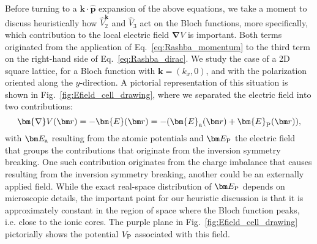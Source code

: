 Before turning to a $\bm{k} \cdot \hat{\bm{p}}$ expansion of the above equations, we take a moment to discuss heuristically how $\hat{V}^{\bm k}_2$ and $\hat{V}_3$ act on the Bloch functions, more specifically, which contribution to the local electric field $\bm{\nabla}V$ is important.
Both terms originated from the application of Eq.~\eqref{eq:Rashba_momentum} to the third term on the right-hand side of Eq.~\eqref{eq:Rashba_dirac}.
We study the case of a 2D square lattice, for a Bloch function with $\bm k = (k_x, 0)$, and with the polarization oriented along the $y$-direction.
A pictorial representation of this situation is shown in Fig.~\ref{fig:Efield_cell_drawing}, where we separated the electric field into two contributions:
\begin{equation}
	\bm{\nabla} V(\bm r) = - \bm{E}(\bm r) = - (\bm{E}_{\rm a}(\bm r) + \bm{E}_{\rm P}(\bm r)),
\end{equation}
with $\bm E_{\rm a}$ resulting from the atomic potentials and $\bm E_{\rm P}$ the electric field that groups the contributions that originate from the inversion symmetry breaking. One such contribution originates from the charge imbalance that causes resulting from the inversion symmetry breaking, another could be an externally applied field.
While the exact real-space distribution of $\bm E_{\rm P}$ depends on microscopic details, the important point for our heuristic discussion is that it is approximately constant in the region of space where the Bloch function peaks, i.e. close to the ionic cores.
The purple plane in Fig.~\ref{fig:Efield_cell_drawing} pictorially shows the potential $V_{\rm P}$ associated with this field.   

